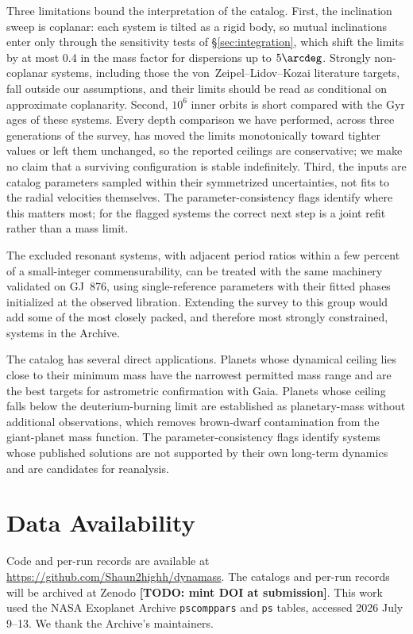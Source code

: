 \documentclass[twocolumn]{aastex631}
\begin{document}
Three limitations bound the interpretation of the catalog. First, the
inclination sweep is coplanar: each system is tilted as a rigid body, so
mutual inclinations enter only through the sensitivity tests of
\S\ref{sec:integration}, which shift the limits by at most 0.4 in the mass
factor for dispersions up to $5\arcdeg$. Strongly non-coplanar systems,
including those the von~Zeipel--Lidov--Kozai literature targets, fall
outside our assumptions, and their limits should be read as conditional on
approximate coplanarity. Second, $10^6$ inner orbits is short compared
with the Gyr ages of these systems. Every depth comparison we have
performed, across three generations of the survey, has moved the limits
monotonically toward tighter values or left them unchanged, so the
reported ceilings are conservative; we make no claim that a surviving
configuration is stable indefinitely. Third, the inputs are catalog
parameters sampled within their symmetrized uncertainties, not fits to the
radial velocities themselves. The parameter-consistency flags identify
where this matters most; for the flagged systems the correct next step is
a joint refit rather than a mass limit.

The excluded resonant systems, with adjacent period ratios within a few
percent of a small-integer commensurability, can be treated with the same
machinery validated on GJ~876, using single-reference parameters with
their fitted phases initialized at the observed libration. Extending the
survey to this group would add some of the most closely packed, and
therefore most strongly constrained, systems in the Archive.

The catalog has several direct applications. Planets whose dynamical
ceiling lies close to their minimum mass have the narrowest permitted mass
range and are the best targets for astrometric confirmation with Gaia.
Planets whose ceiling falls below the deuterium-burning limit are
established as planetary-mass without additional observations, which
removes brown-dwarf contamination from the giant-planet mass function. The
parameter-consistency flags identify systems whose published solutions are
not supported by their own long-term dynamics and are candidates for
reanalysis.

\section{Data Availability} \label{sec:data}

Code and per-run records are available at
\url{https://github.com/Shaun2highh/dynamass}. The catalogs and per-run
records will be archived at Zenodo \textbf{[TODO: mint DOI at submission]}.
This work used the NASA Exoplanet Archive \texttt{pscomppars}
 and
\texttt{ps} 
tables, accessed 2026 July 9--13. We thank the Archive's maintainers.
\end{document}
